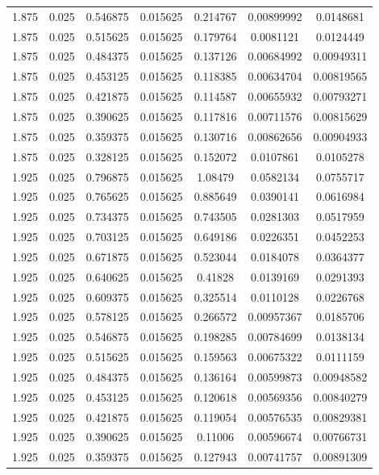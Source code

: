 \begin{flushleft}
\begin{longtable}{ccccccc}
1.875 & 0.025 & 0.546875 & 0.015625 & 0.214767 & 0.00899992 & 0.0148681  \\ 
1.875 & 0.025 & 0.515625 & 0.015625 & 0.179764 & 0.0081121 & 0.0124449  \\ 
1.875 & 0.025 & 0.484375 & 0.015625 & 0.137126 & 0.00684992 & 0.00949311  \\ 
1.875 & 0.025 & 0.453125 & 0.015625 & 0.118385 & 0.00634704 & 0.00819565  \\ 
1.875 & 0.025 & 0.421875 & 0.015625 & 0.114587 & 0.00655932 & 0.00793271  \\ 
1.875 & 0.025 & 0.390625 & 0.015625 & 0.117816 & 0.00711576 & 0.00815629  \\ 
1.875 & 0.025 & 0.359375 & 0.015625 & 0.130716 & 0.00862656 & 0.00904933  \\ 
1.875 & 0.025 & 0.328125 & 0.015625 & 0.152072 & 0.0107861 & 0.0105278  \\ 
1.925 & 0.025 & 0.796875 & 0.015625 & 1.08479 & 0.0582134 & 0.0755717  \\ 
1.925 & 0.025 & 0.765625 & 0.015625 & 0.885649 & 0.0390141 & 0.0616984  \\ 
1.925 & 0.025 & 0.734375 & 0.015625 & 0.743505 & 0.0281303 & 0.0517959  \\ 
1.925 & 0.025 & 0.703125 & 0.015625 & 0.649186 & 0.0226351 & 0.0452253  \\ 
1.925 & 0.025 & 0.671875 & 0.015625 & 0.523044 & 0.0184078 & 0.0364377  \\ 
1.925 & 0.025 & 0.640625 & 0.015625 & 0.41828 & 0.0139169 & 0.0291393  \\ 
1.925 & 0.025 & 0.609375 & 0.015625 & 0.325514 & 0.0110128 & 0.0226768  \\ 
1.925 & 0.025 & 0.578125 & 0.015625 & 0.266572 & 0.00957367 & 0.0185706  \\ 
1.925 & 0.025 & 0.546875 & 0.015625 & 0.198285 & 0.00784699 & 0.0138134  \\ 
1.925 & 0.025 & 0.515625 & 0.015625 & 0.159563 & 0.00675322 & 0.0111159  \\ 
1.925 & 0.025 & 0.484375 & 0.015625 & 0.136164 & 0.00599873 & 0.00948582  \\ 
1.925 & 0.025 & 0.453125 & 0.015625 & 0.120618 & 0.00569356 & 0.00840279  \\ 
1.925 & 0.025 & 0.421875 & 0.015625 & 0.119054 & 0.00576535 & 0.00829381  \\ 
1.925 & 0.025 & 0.390625 & 0.015625 & 0.11006 & 0.00596674 & 0.00766731  \\ 
1.925 & 0.025 & 0.359375 & 0.015625 & 0.127943 & 0.00741757 & 0.00891309  \\ 

\end{longtable}
\end{flushleft}
